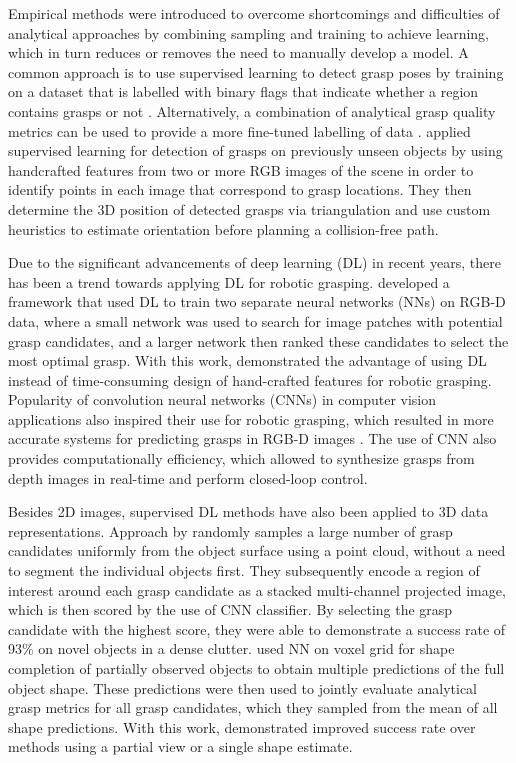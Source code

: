 Empirical methods were introduced to overcome shortcomings and difficulties of analytical approaches by combining sampling and training to achieve learning, which in turn reduces or removes the need to manually develop a model. A common approach is to use supervised learning to detect grasp poses by training on a dataset that is labelled with binary flags that indicate whether a region contains grasps or not \cite{saxena_robotic_2008, lenz_deep_2015}. Alternatively, a combination of analytical grasp quality metrics can be used to provide a more fine-tuned labelling of data \cite{mahler_dex-net_2017, lundell_robust_2019}. \citet{saxena_robotic_2008} applied supervised learning for detection of grasps on previously unseen objects by using handcrafted features from two or more RGB images of the scene in order to identify points in each image that correspond to grasp locations. They then determine the 3D position of detected grasps via triangulation and use custom heuristics to estimate orientation before planning a collision-free path.

Due to the significant advancements of deep learning (DL) in recent years, there has been a trend towards applying DL for robotic grasping. \citet{lenz_deep_2015} developed a framework that used DL to train two separate neural networks (NNs) on RGB-D data, where a small network was used to search for image patches with potential grasp candidates, and a larger network then ranked these candidates to select the most optimal grasp. With this work, \citeauthor{lenz_deep_2015} demonstrated the advantage of using DL instead of time-consuming design of hand-crafted features for robotic grasping. Popularity of convolution neural networks (CNNs) in computer vision applications also inspired their use for robotic grasping, which resulted in more accurate systems for predicting grasps in RGB-D images \cite{redmon_real-time_2015, kumra_robotic_2017}. The use of CNN also provides computationally efficiency, which allowed \citet{morrison_closing_2018} to synthesize grasps from depth images in real-time and perform closed-loop control.

Besides 2D images, supervised DL methods have also been applied to 3D data representations. Approach by \citet{ten_pas_grasp_2017} randomly samples a large number of grasp candidates uniformly from the object surface using a point cloud, without a need to segment the individual objects first. They subsequently encode a region of interest around each grasp candidate as a stacked multi-channel projected image, which is then scored by the use of CNN classifier. By selecting the grasp candidate with the highest score, they were able to demonstrate a success rate of 93\% on novel objects in a dense clutter. \cite{lundell_robust_2019} used NN on voxel grid for shape completion of partially observed objects to obtain multiple predictions of the full object shape. These predictions were then used to jointly evaluate analytical grasp metrics \cite{roa_grasp_2015} for all grasp candidates, which they sampled from the mean of all shape predictions. With this work, \citeauthor{lundell_robust_2019} demonstrated improved success rate over methods using a partial view or a single shape estimate.

